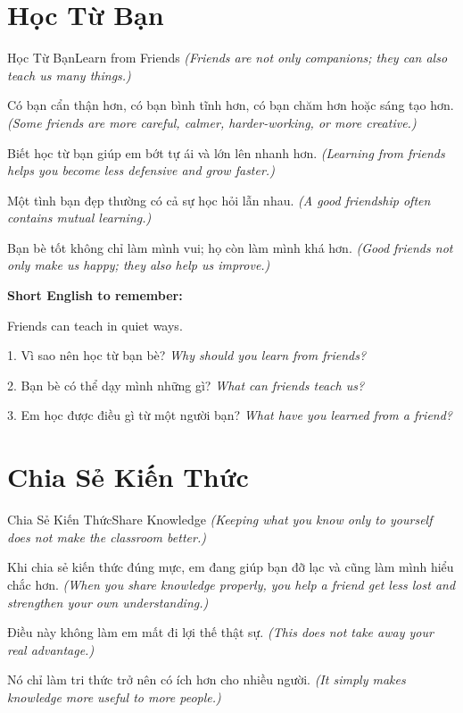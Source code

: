 \section{Học Từ Bạn}
\begin{truyen}{Học Từ Bạn}{Learn from Friends}
\textit{(Friends are not only companions; they can also teach us many things.)}

Có bạn cẩn thận hơn, có bạn bình tĩnh hơn, có bạn chăm hơn hoặc sáng tạo hơn.
\textit{(Some friends are more careful, calmer, harder-working, or more creative.)}

Biết học từ bạn giúp em bớt tự ái và lớn lên nhanh hơn.
\textit{(Learning from friends helps you become less defensive and grow faster.)}

Một tình bạn đẹp thường có cả sự học hỏi lẫn nhau.
\textit{(A good friendship often contains mutual learning.)}
\end{truyen}

\begin{baihoc}
Bạn bè tốt không chỉ làm mình vui; họ còn làm mình khá hơn.
\textit{(Good friends not only make us happy; they also help us improve.)}
\end{baihoc}

\begin{ghinhoanh}
\textbf{Short English to remember:}

Friends can teach in quiet ways.

\end{ghinhoanh}

\begin{tuhocnhanh}
1. Vì sao nên học từ bạn bè? \textit{Why should you learn from friends?}

2. Bạn bè có thể dạy mình những gì? \textit{What can friends teach us?}

3. Em học được điều gì từ một người bạn? \textit{What have you learned from a friend?}
\end{tuhocnhanh}
\ngancach

\section{Chia Sẻ Kiến Thức}
\begin{truyen}{Chia Sẻ Kiến Thức}{Share Knowledge}
\textit{(Keeping what you know only to yourself does not make the classroom better.)}

Khi chia sẻ kiến thức đúng mực, em đang giúp bạn đỡ lạc và cũng làm mình hiểu chắc hơn.
\textit{(When you share knowledge properly, you help a friend get less lost and strengthen your own understanding.)}

Điều này không làm em mất đi lợi thế thật sự.
\textit{(This does not take away your real advantage.)}

Nó chỉ làm tri thức trở nên có ích hơn cho nhiều người.
\textit{(It simply makes knowledge more useful to more people.)}
\end{truyen}

